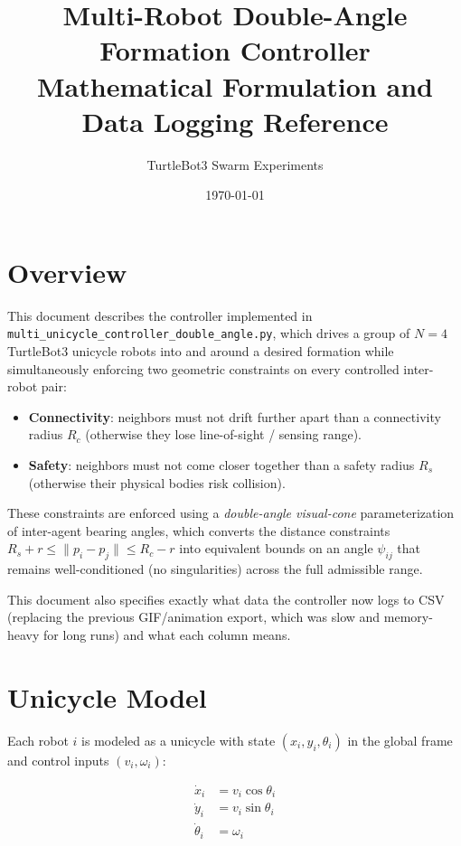 \documentclass[11pt]{article}
\title{Multi-Robot Double-Angle Formation Controller\\
\large Mathematical Formulation and Data Logging Reference}
\author{TurtleBot3 Swarm Experiments}
\date{\today}
\begin{document}
\maketitle

\section{Overview}

This document describes the controller implemented in
\texttt{multi\_unicycle\_controller\_double\_angle.py}, which drives a group of
$N = 4$ TurtleBot3 unicycle robots into and around a desired formation while
simultaneously enforcing two geometric constraints on every controlled
inter-robot pair:

\begin{itemize}
    \item \textbf{Connectivity}: neighbors must not drift further apart than a
    connectivity radius $R_c$ (otherwise they lose line-of-sight / sensing
    range).
    \item \textbf{Safety}: neighbors must not come closer together than a
    safety radius $R_s$ (otherwise their physical bodies risk collision).
\end{itemize}

These constraints are enforced using a \emph{double-angle visual-cone}
parameterization of inter-agent bearing angles, which converts the distance
constraints $R_s + r \le \lVert p_i - p_j \rVert \le R_c - r$ into equivalent
bounds on an angle $\psi_{ij}$ that remains well-conditioned (no singularities)
across the full admissible range.

This document also specifies exactly what data the controller now logs to
CSV (replacing the previous GIF/animation export, which was slow and
memory-heavy for long runs) and what each column means.

\section{Unicycle Model}

Each robot $i$ is modeled as a unicycle with state $(x_i, y_i, \theta_i)$ in
the global frame and control inputs $(v_i, \omega_i)$:

\begin{align}
    \dot{x}_i &= v_i \cos\theta_i \\
    \dot{y}_i &= v_i \sin\theta_i \\
    \dot{\theta}_i &= \omega_i
\end{align}
\end{document}
